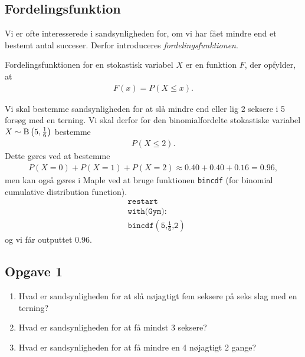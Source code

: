 \subsection*{Fordelingsfunktion}

Vi er ofte interesserede i sandsynligheden for, om vi har fået mindre end et bestemt antal succeser. Derfor introduceres \textit{fordelingsfunktionen}.
\begin{defn}[Fordelingsfunktion]
	Fordelingsfunktionen for en stokastisk variabel $X$ er en funktion $F$, der opfylder, at
	\begin{align*}
		F(x) = P(X \leq x).
	\end{align*}
\end{defn}

\begin{exa}
	Vi skal bestemme sandsynligheden for at slå mindre end eller lig 2 seksere i 5 forsøg med en terning. Vi skal derfor for den binomialfordelte stokastiske variabel $X \sim 		
	\textnormal{B}\left(5,\frac{1}{6}\right)$ bestemme
	\begin{align*}
		P(X \leq 2).
	\end{align*}
	Dette gøres ved at bestemme 
	\begin{align*}
		P(X = 0) + P(X = 1) + P(X = 2) \approx 0.40 + 0.40 + 0.16 = 0.96,
	\end{align*}
	men kan også gøres i Maple ved at bruge funktionen \texttt{bincdf} (for binomial cumulative distribution function).
	\begin{align*}
		&\texttt{restart}\\
		&\texttt{with(Gym):}\\
		&\texttt{bincdf$\left(\texttt{5,$\frac{\texttt{1}}{\texttt{6}}$,2}\right)$}
	\end{align*}
	og vi får outputtet 0.96.
\end{exa}



\subsection*{Opgave 1}
\begin{enumerate}[label=\roman*)]
	\item Hvad er sandsynligheden for at slå nøjagtigt fem seksere på seks slag med en terning?
	\item Hvad er sandsynligheden for at få mindst 3 seksere?
	\item Hvad er sandsynligheden for at få mindre en 4 nøjagtigt 2 gange?
\end{enumerate}
